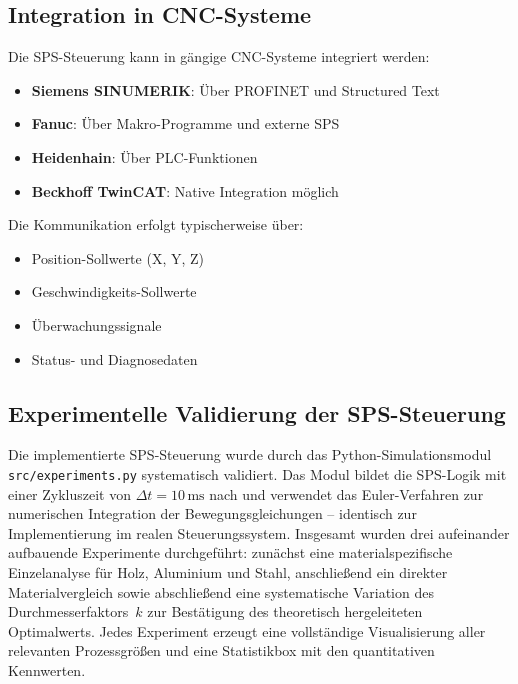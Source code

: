 ﻿\documentclass[12pt,a4paper]{article}
\begin{document}
\subsection{Integration in CNC-Systeme}

Die SPS-Steuerung kann in gängige CNC-Systeme integriert werden:

\begin{itemize}
	\item \textbf{Siemens SINUMERIK}: Über PROFINET und Structured Text
	\item \textbf{Fanuc}: Über Makro-Programme und externe SPS
	\item \textbf{Heidenhain}: Über PLC-Funktionen
	\item \textbf{Beckhoff TwinCAT}: Native Integration möglich
\end{itemize}

Die Kommunikation erfolgt typischerweise über:
\begin{itemize}
	\item Position-Sollwerte (X, Y, Z)
	\item Geschwindigkeits-Sollwerte
	\item Überwachungssignale
	\item Status- und Diagnosedaten
\end{itemize}

\subsection{Experimentelle Validierung der SPS-Steuerung}

Die implementierte SPS-Steuerung wurde durch das Python-Simulationsmodul \texttt{src/\allowbreak{}experiments.py} systematisch validiert. Das Modul bildet die SPS-Logik mit einer Zykluszeit von $\Delta t = 10\,\text{ms}$ nach und verwendet das Euler-Verfahren zur numerischen Integration der Bewegungsgleichungen -- identisch zur Implementierung im realen Steuerungssystem. Insgesamt wurden drei aufeinander aufbauende Experimente durchgeführt: zunächst eine materialspezifische Einzelanalyse für Holz, Aluminium und Stahl, anschließend ein direkter Materialvergleich sowie abschließend eine systematische Variation des Durchmesserfaktors~$k$ zur Bestätigung des theoretisch hergeleiteten Optimalwerts. Jedes Experiment erzeugt eine vollständige Visualisierung aller relevanten Prozessgrößen und eine Statistikbox mit den quantitativen Kennwerten.

\end{document}
